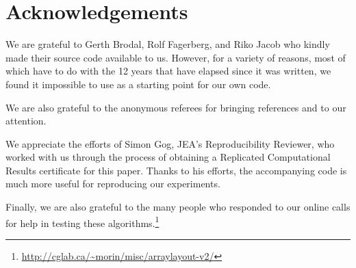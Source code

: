 \documentclass{patmorin}
\begin{document}
%
%
%

\section*{Acknowledgements}

We are grateful to  Gerth Brodal, Rolf Fagerberg, and Riko Jacob who
kindly made their source code available to us. However, for a variety
of reasons, most of which have to do with the 12 years that have elapsed
since it was written, we found it impossible to use as a starting point
for our own code.

We are also grateful to the anonymous referees for bringing references
\cite{sanders.winkel:super} and \cite{kim.chhugani.ea:fast} to our
attention.

We appreciate the efforts of Simon Gog, JEA's Reproducibility Reviewer,
who worked with us through the process of obtaining a Replicated
Computational Results certificate for this paper. Thanks to his efforts,
the accompanying code is much more useful for reproducing our experiments.

Finally, we are also grateful to the many people who responded
to our online calls for help in testing these
algorithms.\footnote{\url{http://cglab.ca/~morin/misc/arraylayout-v2/}}




\end{document}
